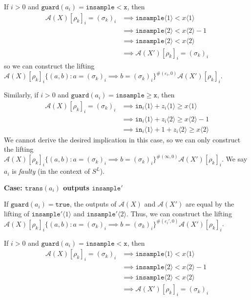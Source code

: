 \documentclass[12pt]{article}
\newcommand{\gguard}[1][x]{\texttt{insample}\geq \texttt{#1}}
\newcommand{\lguard}[1][x]{\texttt{insample} < \texttt{#1}}
\newcommand{\brangle}[1]{\langle #1 \rangle}
\newcommand{\guard}{\texttt{guard}}
\newcommand{\trans}{\texttt{trans}}
\theoremstyle{definition}
\begin{document}
If $i > 0$ and $\guard(a_i) = \lguard$, then \begin{align*}
	\mathcal{A}(X)[\rho_k]_i = (\sigma_k)_i&\implies \texttt{insample}\brangle{1} < x\brangle{1}\\
	&\implies \texttt{insample}\brangle{2} < x\brangle{2}-1\\
	&\implies \texttt{insample}\brangle{2} < x\brangle{2}\\
	&\implies \mathcal{A}(X')[\rho_k]_i = (\sigma_k)_i
\end{align*}
so we can construct the lifting $\mathcal{A}(X)[\rho_k]_i\{(a, b): a = (\sigma_k)_i \implies b = (\sigma_k)_i\}^{\#(\varepsilon_i, 0)}\mathcal{A}(X')[\rho_k]_i$.

Similarly, if $i>0$ and $\guard(a_i) = \gguard$, then \begin{align*}
	\mathcal{A}(X)[\rho_k]_i = (\sigma_k)_i&\implies \texttt{in}_i\brangle{1} + z_i\brangle{1} \geq x\brangle{1}\\
	&\implies \texttt{in}_i\langle 1\rangle + z_i\langle 2 \rangle  \geq x\langle 2 \rangle-1\\
	&\implies \texttt{in}_i\langle 1\rangle + 1 + z_i\langle 2 \rangle  \geq x\langle 2 \rangle
\end{align*}
We cannot derive the desired implication in this case, so we can only construct the lifting $\mathcal{A}(X)[\rho_k]_i\{(a, b): a = (\sigma_k)_i \implies b = (\sigma_k)_i\}^{\#(\infty, 0)}\mathcal{A}(X')[\rho_k]_i$. We say $a_i$ is \textit{faulty} (in the context of $S^L$).


\textbf{Case: $\trans(a_i)$ outputs $\texttt{insample}'$}

If $\guard(a_i) = \texttt{true}$, the outputs of $\mathcal{A}(X)$ and $\mathcal{A}(X')$ are equal by the lifting of $\texttt{insample}'\brangle{1}$ and $\texttt{insample}'\brangle{2}$. Thus, we can construct the lifting  $\mathcal{A}(X)[\rho_k]_i\{(a, b): a = (\sigma_k)_i \implies b = (\sigma_k)_i\}^{\#(\varepsilon_i', 0)}\mathcal{A}(X')[\rho_k]_i$.

If $i > 0$ and $\guard(a_i) = \lguard$, then \begin{align*}
	\mathcal{A}(X)[\rho_k]_i = (\sigma_k)_i&\implies \texttt{insample}\brangle{1} < x\brangle{1}\\
	&\implies \texttt{insample}\brangle{2} < x\brangle{2}-1\\
	&\implies \texttt{insample}\brangle{2} < x\brangle{2}\\
	&\implies \mathcal{A}(X')[\rho_k]_i = (\sigma_k)_i
\end{align*}
\end{document}
